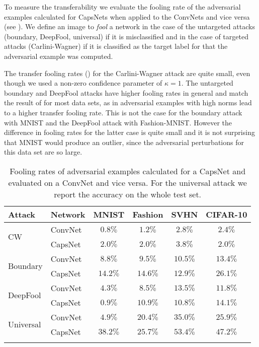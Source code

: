 To measure the transferability we evaluate the fooling rate of the adversarial examples calculated for CapsNets when applied to the ConvNets and vice versa (see ). We define an image to \emph{fool} a network in the case of the untargeted attacks (boundary, DeepFool, universal) if it is misclassified and in the case of targeted attacks (Carlini-Wagner) if it is classified as the target label for that the adversarial example was computed.

The transfer fooling rates () for the Carlini-Wagner attack are quite small, even though we used a non-zero confidence parameter of $\kappa=1$.
The untargeted boundary and DeepFool attacks have higher fooling rates in general and match the result of  for most data sets, as in adversarial examples with high norms lead to a higher transfer fooling rate.
This is not the case for the boundary attack with MNIST and the DeepFool attack with Fashion-MNIST. However the difference in fooling rates for the latter case is quite small and it is not surprising that MNIST would produce an outlier, since the adversarial perturbations for this data set are so large.

\begin{table}
	\centering
	\begin{tabular}{llcccc}
		\toprule
		Attack & Network       & MNIST & Fashion & SVHN & CIFAR-10  \\
		\midrule
		\multirow{2}{*}{CW} & ConvNet & $0.8\%$ & $1.2\%$ & $2.8\%$ & $2.4\%$ \\
		& CapsNet            & $2.0\%$ & $2.0\%$ & $3.8\%$ & $2.0\%$ \\
		\midrule
		\multirow{2}{*}{Boundary} & ConvNet & $8.8\%$ & $9.5\%$ & $10.5\%$ & $13.4\%$ \\
		& CapsNet            & $14.2\%$ & $14.6\%$ & $12.9\%$ & $26.1\%$ \\
		\midrule
		\multirow{2}{*}{DeepFool} & ConvNet & $4.3\%$ & $8.5\%$ & $13.5\%$ & $11.8\%$ \\
		& CapsNet           & $0.9\%$ & $10.9\%$ & $10.8\%$ & $14.1\%$ \\
		\midrule
		\multirow{2}{*}{Universal} & ConvNet & $4.9\%$ & $20.4\%$ & $35.0\%$ & $25.9\%$ \\
		& CapsNet           & $38.2\%$ & $25.7\%$ & $53.4\%$ & $47.2\%$ \\
		\bottomrule\\
	\end{tabular}
	\caption[Transfer Fooling Rates]{Fooling rates of adversarial examples calculated for a CapsNet and evaluated on a ConvNet and vice versa. For the universal attack we report the accuracy on the whole test set.}
	\label{tab:transfer}
\end{table}

